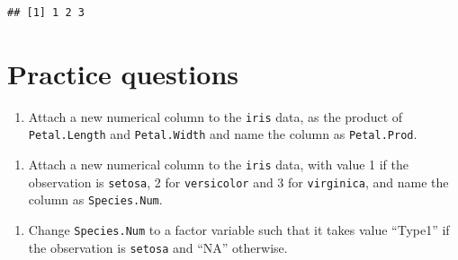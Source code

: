 \documentclass[
]{book}
\newenvironment{Shaded}{\begin{snugshade}}{\end{snugshade}}
\newcommand{\KeywordTok}[1]{\textcolor[rgb]{0.13,0.29,0.53}{\textbf{#1}}}
\newcommand{\NormalTok}[1]{#1}
\newcommand{\OperatorTok}[1]{\textcolor[rgb]{0.81,0.36,0.00}{\textbf{#1}}}
\newcommand{\StringTok}[1]{\textcolor[rgb]{0.31,0.60,0.02}{#1}}
\providecommand{\tightlist}{%
  \setlength{\itemsep}{0pt}\setlength{\parskip}{0pt}}
\begin{document}
\begin{verbatim}
## [1] 1 2 3
\end{verbatim}

\hypertarget{practice-questions}{%
\section{Practice questions}\label{practice-questions}}

\begin{enumerate}
\def\labelenumi{\arabic{enumi}.}
\tightlist
\item
  Attach a new numerical column to the \texttt{iris} data, as the product of \texttt{Petal.Length} and \texttt{Petal.Width} and name the column as \texttt{Petal.Prod}.
\end{enumerate}

\begin{Shaded}
\end{Shaded}

\begin{enumerate}
\def\labelenumi{\arabic{enumi}.}
\setcounter{enumi}{1}
\tightlist
\item
  Attach a new numerical column to the \texttt{iris} data, with value 1 if the observation is \texttt{setosa}, 2 for \texttt{versicolor} and 3 for \texttt{virginica}, and name the column as \texttt{Species.Num}.
\end{enumerate}

\begin{Shaded}
\end{Shaded}

\begin{enumerate}
\def\labelenumi{\arabic{enumi}.}
\setcounter{enumi}{2}
\tightlist
\item
  Change \texttt{Species.Num} to a factor variable such that it takes value ``Type1'' if the observation is \texttt{setosa} and ``NA'' otherwise.
\end{enumerate}
\end{document}
